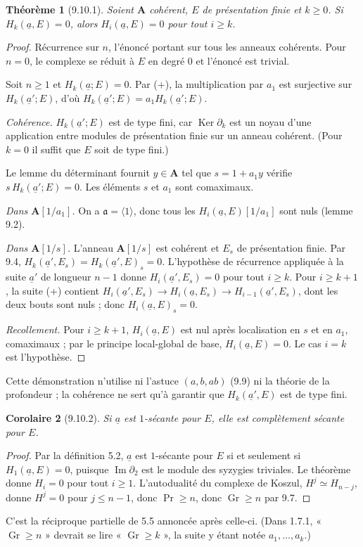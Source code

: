 \documentclass[11pt]{amsart}
\newtheorem{theorem}{Théorème}
\newtheorem{corollary}[theorem]{Corolaire}
\theoremstyle{definition}
\theoremstyle{remark}
\DeclareMathOperator{\Ker}{Ker}
\DeclareMathOperator{\Ima}{Im}
\DeclareMathOperator{\Gr}{Gr}
\renewcommand{\Pr}{\operatorname{Pr}}
\newcommand{\A}{\mathbf{A}}
\newcommand{\ua}{\underline{a}}
\newcommand{\fa}{\mathfrak{a}}
\begin{document}
\begin{theorem}[9.10.1]
Soient $\A$ cohérent, $E$ de présentation finie et $k\ge0$. Si
$H_k(\ua,E)=0$, alors $H_i(\ua,E)=0$ pour tout $i\ge k$.
\end{theorem}

\begin{proof}
Récurrence sur $n$, l'énoncé portant sur tous les anneaux cohérents. Pour
$n=0$, le complexe se réduit à $E$ en degré $0$ et l'énoncé est trivial.

Soit $n\ge1$ et $H_k(\ua;E)=0$. Par (+), la multiplication par $a_1$ est
surjective sur $H_k(\ua';E)$, d'où $H_k(\ua';E)=a_1H_k(\ua';E)$.

\emph{Cohérence.} $H_k(\ua';E)$ est de type fini, car $\Ker\partial_k$
est un noyau d'une application entre modules de présentation finie sur un
anneau cohérent. (Pour $k=0$ il suffit que $E$ soit de type fini.)

Le lemme du déterminant fournit $y\in\A$ tel que $s=1+a_1y$ vérifie
$s\,H_k(\ua';E)=0$. Les éléments $s$ et $a_1$ sont comaximaux.

\emph{Dans $\A[1/a_1]$.} On a $\fa=\langle1\rangle$, donc tous les
$H_i(\ua,E)[1/a_1]$ sont nuls (lemme 9.2).

\emph{Dans $\A[1/s]$.} L'anneau $\A[1/s]$ est cohérent et $E_s$ de
présentation finie. Par 9.4, $H_k(\ua',E_s)=H_k(\ua',E)_s=0$. L'hypothèse
de récurrence appliquée à la suite $\ua'$ de longueur $n-1$ donne
$H_i(\ua',E_s)=0$ pour tout $i\ge k$. Pour $i\ge k+1$, la suite (+)
contient $H_i(\ua',E_s)\to H_i(\ua,E_s)\to H_{i-1}(\ua',E_s)$, dont les
deux bouts sont nuls ; donc $H_i(\ua,E)_s=0$.

\emph{Recollement.} Pour $i\ge k+1$, $H_i(\ua,E)$ est nul après
localisation en $s$ et en $a_1$, comaximaux ; par le principe local-global
de base, $H_i(\ua,E)=0$. Le cas $i=k$ est l'hypothèse.
\end{proof}

\noindent Cette démonstration n'utilise ni l'astuce $(a,b,ab)$ (9.9) ni la
théorie de la profondeur ; la cohérence ne sert qu'à garantir que
$H_k(\ua',E)$ est de type fini.

\begin{corollary}[9.10.2]
Si $\ua$ est $1$-sécante pour $E$, elle est complètement sécante pour $E$.
\end{corollary}
\begin{proof}
Par la définition 5.2, $\ua$ est $1$-sécante pour $E$ si et seulement si
$H_1(\ua,E)=0$, puisque $\Ima\partial_2$ est le module des syzygies
triviales. Le théorème donne $H_i=0$ pour tout $i\ge1$. L'autodualité du
complexe de Koszul, $H^j\simeq H_{n-j}$, donne $H^j=0$ pour $j\le n-1$,
donc $\Pr\ge n$, donc $\Gr\ge n$ par 9.7.
\end{proof}
\noindent C'est la réciproque partielle de 5.5 annoncée après celle-ci.
(Dans 1.7.1, « $\Gr\ge n$ » devrait se lire « $\Gr\ge k$ », la suite y
étant notée $a_1,\dots,a_k$.)
\end{document}
